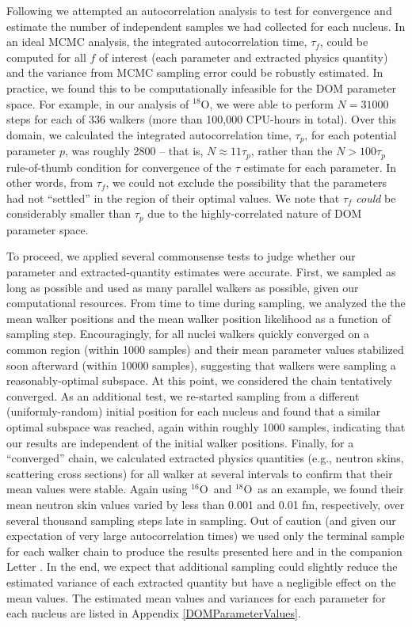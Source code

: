 \documentclass[twocolumn,secnumarabic,amssymb, nobibnotes, aps, prl,
superscriptaddress, nobalancelastpage, draft]{revtex4}
\newcommand{\oSix}{\ensuremath{^{16}}O}
\newcommand{\oEight}{\ensuremath{^{18}}O}
\begin{document}
Following \cite{Foreman-Mackey2013} we attempted an
autocorrelation analysis to test for convergence
and estimate the number of independent samples we had collected for each nucleus.
In an ideal MCMC analysis, the integrated autocorrelation time, $\tau_{f}$,
could be computed for all $f$ of interest (each parameter and extracted physics
quantity) and the variance from MCMC sampling error could be robustly estimated.
In practice, we found this to be computationally infeasible
for the DOM parameter space. For example, in our analysis of \oEight, we were
able to perform $N=31000$ steps for each of 336 walkers (more than 100,000
CPU-hours in total). Over this domain, we calculated the
integrated autocorrelation time, $\tau_{p}$, for each potential parameter $p$,
was roughly 2800 -- that is, $N \approx 11\tau_{p}$, rather than the
$N > 100\tau_{p}$ rule-of-thumb condition for convergence of the $\tau$ estimate
for each parameter. In other words, from $\tau_{f}$, we could not exclude the
possibility that the parameters had not ``settled'' in the region of their
optimal values. We note that $\tau_{f}$ \textit{could} be considerably
smaller than $\tau_{p}$ due to the highly-correlated nature of DOM parameter space.

To proceed, we applied several commonsense tests to
judge whether our parameter and extracted-quantity estimates were accurate.
First, we sampled as long as possible and used as many parallel walkers as
possible, given our computational resources. From time to time during sampling,
we analyzed the the mean walker positions and the mean walker position likelihood
as a function of sampling step. Encouragingly, for all nuclei walkers quickly
converged on a common region (within 1000 samples) and their mean parameter
values stabilized soon afterward (within 10000 samples), suggesting that walkers
were sampling a reasonably-optimal subspace. At this point, we considered the chain
tentatively converged. As an additional test, we re-started sampling from a different
(uniformly-random) initial position for each nucleus and found that a similar
optimal subspace was reached, again within roughly 1000 samples, indicating that
our results are independent of the initial walker positions. Finally, for a
``converged'' chain, we calculated extracted physics quantities (e.g., neutron
skins, scattering cross sections) for all walker at several intervals
to confirm that their mean values were stable. Again using \oSix\ and \oEight\ as
an example, we found their mean neutron skin values varied by less
than 0.001 and 0.01 fm, respectively, over several thousand sampling steps late
in sampling. Out of caution (and given our expectation of very large autocorrelation times)
we used only the terminal sample for each walker chain to produce
the results presented here and in the companion Letter \cite{Pruitt2020PRL}.
In the end, we expect that additional sampling could slightly
reduce the estimated variance of each extracted quantity but have a negligible
effect on the mean values. The estimated mean values and variances for each
parameter for each nucleus are listed in Appendix \ref{DOMParameterValues}.
\end{document}
